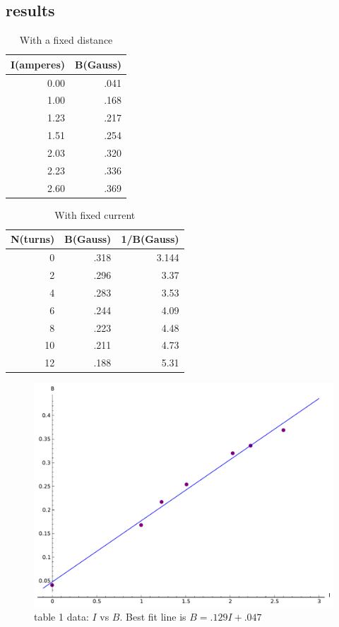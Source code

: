 \documentclass[12pt]{article}
\begin{document}
\subsection*{results}
	
	\begin{table}[hp]
	\caption{With a fixed distance}
	\centering
	\begin{tabular}{|r|r|}
	\hline 
	I(amperes) & B(Gauss) \\
	\hline 
	0.00 & .041 \\
	1.00 & .168 \\
	1.23 & .217 \\
	1.51 & .254 \\
	2.03 & .320 \\
	2.23 & .336 \\
	2.60 & .369 \\
	\hline
	\end{tabular}
	\end{table}

	\begin{table}[hp] 
	\caption{With fixed current}
	\centering
	\begin{tabular}{|r|r|r|}
	\hline 
	N(turns) & B(Gauss) & 1/B(Gauss) \\
	\hline 
	0 & .318 & 3.144 \\
	2 & .296 & 3.37 \\
	4 & .283 & 3.53 \\
	6 & .244 & 4.09\\
	8 & .223 & 4.48 \\
	10 & .211 & 4.73 \\
	12 & .188  & 5.31\\
	\hline
	\end{tabular}
	\end{table}

	\begin{figure}[hp]
	 \centering
	 \includegraphics[scale = .85]{plot1}
	 \caption*{table 1 data: $I$ vs $B$. Best fit line is $B = .129I + .047$}
	\end{figure} 
\end{document}
